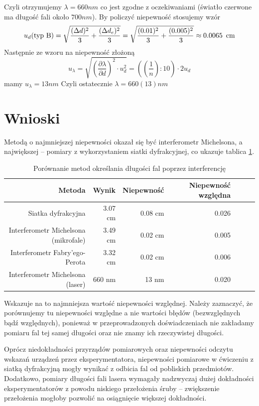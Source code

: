 \documentclass[a4paper]{article}
\newlength{\du}
\begin{document}
Czyli otrzymujemy $\lambda = 660nm$ co jest zgodne z oczekiwaniami (światło czerwone ma długość fali około $700 nm$). By policzyć niepewność stosujemy wzór $$u_d (\text{typ B}) = \sqrt{\frac{(\Delta d)^2}{3} + \frac{(\Delta d_e)^2}{3}} = \sqrt{\frac{(0.01)^2}{3} + \frac{(0.005)^2}{3}} \approx 0.0065 \enskip \text{cm}$$
Następnie ze wzoru na niepewność złożoną
$$u_{\lambda} = \sqrt{(\frac{\partial \lambda}{\partial d})^2 \cdot u_d^2 } = ((\frac{1}{n}):10) \cdot 2 u_d$$
mamy 
$u_{\lambda} = 13nm$
Czyli ostatecznie $\lambda = 660(13)nm$
\section{Wnioski}
Metodą o najmniejszej niepewności okazał się być interferometr Michelsona, a największej -- pomiary z wykorzystaniem siatki dyfrakcyjnej, co ukazuje tablica \ref{porownanie_metod}.
\begin{table}[h!]
\begin{tabular}{rrrrrrr}
\toprule
Metoda & Wynik & Niepewność & Niepewność względna\\
\midrule
Siatka dyfrakcyjna & 3.07 cm & 0.08 cm & 0.026\\
Interferometr Michelsona (mikrofale) & 3.49 cm & 0.02 cm & 0.005\\
Interferometr Fabry'ego-Perota & 3.32 cm & 0.02 cm & 0.006\\
Interferometr Michelsona (laser) & 660 nm & 13 nm & 0.020\\
\bottomrule
\end{tabular}
\caption{Porównanie metod określania długości fal poprzez interferencję}
\label{porownanie_metod}
\end{table}
Wskazuje na to najmniejsza wartość niepewności względnej. Należy zaznaczyć, że porównujemy tu niepewności
względne a nie wartości błędów (bezwzględnych bądź względnych), ponieważ w przeprowadzonych doświadczeniach
nie zakładamy pomiaru fal tej samej długości oraz nie znamy ich rzeczywistej długości.

Oprócz niedokładności przyrządów pomiarowych oraz niepewności odczytu wskazań urządzeń przez eksperymentatora,
niepewności pomiarowe w ćwiczeniu z siatką dyfrakcyjną mogły wynikać z odbicia fal od pobliskich przedmiotów.
Dodatkowo, pomiary długości fali lasera wymagały nadzwyczaj dużej dokładności eksperymentatorów z powodu niskiego
przełożenia śruby -- zwiększenie przełożenia mogłoby pozwolić na osiągnięcie większej dokładności.
\end{document}
